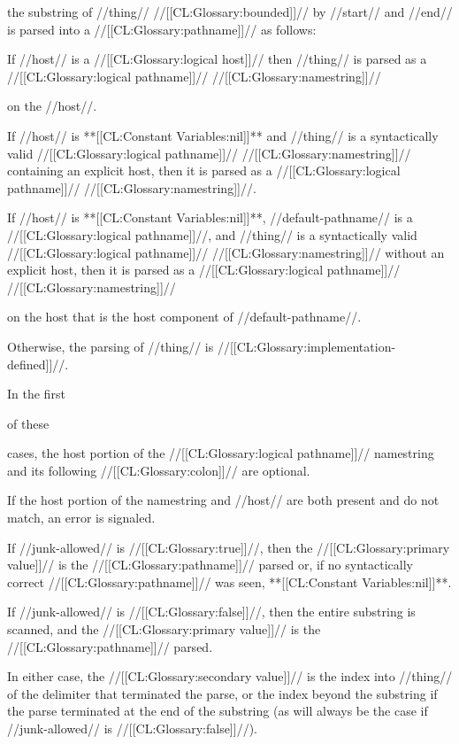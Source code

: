 the substring of //thing// //[[CL:Glossary:bounded]]// by //start// and //end// is parsed into a //[[CL:Glossary:pathname]]// as follows:

\beginlist

\itemitem{\bull} If //host// is a //[[CL:Glossary:logical host]]// then //thing// is parsed as a //[[CL:Glossary:logical pathname]]// //[[CL:Glossary:namestring]]//

on the //host//.

\itemitem{\bull} If //host// is **[[CL:Constant Variables:nil]]** and //thing// is a syntactically valid //[[CL:Glossary:logical pathname]]// //[[CL:Glossary:namestring]]// containing an explicit host, then it is parsed as a //[[CL:Glossary:logical pathname]]// //[[CL:Glossary:namestring]]//.

\itemitem{\bull} If //host// is **[[CL:Constant Variables:nil]]**, //default-pathname// is a //[[CL:Glossary:logical pathname]]//, and //thing// is a syntactically valid //[[CL:Glossary:logical pathname]]// //[[CL:Glossary:namestring]]// without an explicit host, then it is parsed as a //[[CL:Glossary:logical pathname]]// //[[CL:Glossary:namestring]]//

on the host that is the host component of //default-pathname//.

\itemitem{\bull} Otherwise, the parsing of //thing// is //[[CL:Glossary:implementation-defined]]//.

\endlist

In the first

of these

cases, the host portion of the //[[CL:Glossary:logical pathname]]// namestring and its following //[[CL:Glossary:colon]]// are optional.

If the host portion of the namestring and //host// are both present and do not match, an error is signaled.

If //junk-allowed// is //[[CL:Glossary:true]]//, then the //[[CL:Glossary:primary value]]// is the //[[CL:Glossary:pathname]]// parsed or, if no syntactically correct //[[CL:Glossary:pathname]]// was seen, **[[CL:Constant Variables:nil]]**.

If //junk-allowed// is //[[CL:Glossary:false]]//, then the entire substring is scanned, and the //[[CL:Glossary:primary value]]// is the //[[CL:Glossary:pathname]]// parsed.

In either case, the //[[CL:Glossary:secondary value]]// is the index into //thing// of the delimiter that terminated the parse, or the index beyond the substring if the parse terminated at the end of the substring (as will always be the case if //junk-allowed// is //[[CL:Glossary:false]]//).

